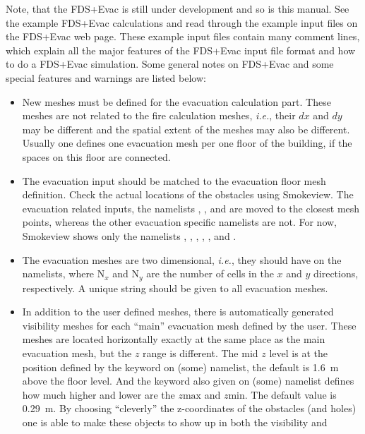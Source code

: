 \documentclass[12pt,a4paper,final,twoside]{stylevk}
\begin{document}
Note, that the FDS+Evac is still under development and so is this
manual.  See the example FDS+Evac calculations and read through the
example input files on the FDS+Evac web page.  These example input
files contain many comment lines, which explain all the major features
of the FDS+Evac input file format and how to do a FDS+Evac simulation.
Some general notes on FDS+Evac and some special features and warnings
are listed below:
%
\begin{itemize}
%
\item New meshes must be defined for the evacuation calculation part.
  These meshes are not related to the fire calculation meshes,
  \emph{i.e.}, their $dx$ and $dy$ may be different and the spatial
  extent of the meshes may also be different.  Usually one defines one
  evacuation mesh per one floor of the building, if the spaces on this
  floor are connected. 
%
\item The evacuation input should be matched to the evacuation floor
  mesh definition.  Check the actual locations of the obstacles using
  Smokeview.  The evacuation related inputs, the namelists
  , , and  are moved to the
  closest mesh points, whereas the other evacuation specific namelists
  are not.  For now, Smokeview shows only the namelists ,
  , , , , and
  .
%
\item The evacuation meshes are two dimensional, \emph{i.e.}, they
  should have  on the 
  namelists, where N${}_x$ and N${}_y$ are the number of cells in the
  $x$ and $y$ directions, respectively.  A unique  string
  should be given to all evacuation meshes.
%
\item In addition to the user defined meshes, there is automatically
  generated visibility meshes for each ``main'' evacuation mesh
  defined by the user.  These meshes are located horizontally exactly
  at the same place as the main evacuation mesh, but the $z$ range is
  different. The mid $z$ level is at the  position defined by the
  keyword  on (some) 
  namelist, the default is 1.6~m above the floor level. And the
  keyword  also given on (some) 
  namelist defines how much higher and lower are the $z\mathrm{max}$
  and $z\mathrm{min}$.  The default value is 0.29~m.  By choosing
  ``cleverly'' the z-coordinates of the obstacles (and holes) one is
  able to make these objects to show up in both the visibility and

\end{itemize}
\end{document}
